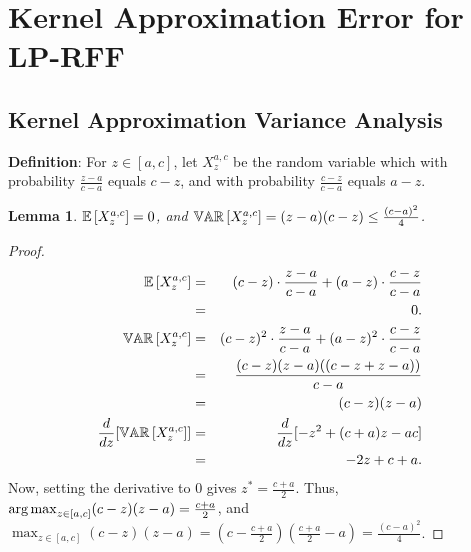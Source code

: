 \documentclass[12pt]{article}
\newtheorem{lemma}[theorem]{Lemma}
\begin{document}
%


\section{Kernel Approximation Error for LP-RFF}
\label{sec:kernel_approx}

\subsection{Kernel Approximation Variance Analysis}
\noindent\textbf{Definition}:  For $z \in [a,c]$, let $X_z^{a,c}$ be the random variable which with probability $\frac{z-a}{c-a}$ equals $c-z$, and with probability $\frac{c-z}{c-a}$ equals $a-z$.

\begin{lemma}
\label{lemma:qvar}
$\expect{}{X_z^{a,c}} = 0$, and $\var{}{X_z^{a,c}} = (z-a)(c-z) \leq \frac{(c-a)^2}{4}$.
\end{lemma}

\begin{proof}
\begin{eqnarray*}
	\expect{}{X_z^{a,c}} &=&  (c-z)\cdot \frac{z-a}{c-a} + (a-z)\cdot \frac{c-z}{c-a}\\
	&=& 0 .\\
	\var{}{X_z^{a,c}} &=& (c-z)^2\cdot \frac{z-a}{c-a} + (a-z)^2\cdot \frac{c-z}{c-a}\\
	&=& \frac{(c-z)(z-a)((c-z + z-a))}{c-a} \\
	&=& (c-z)(z-a)\\
	\frac{d}{dz}[\var{}{X_z^{a,c}}] &=& \frac{d}{dz}[-z^2 + (c+a)z -ac] \\
	&=& -2z + c+a.
\end{eqnarray*}
Now, setting the derivative to 0 gives $z^* = \frac{c+a}{2}$.  Thus, $\operatorname*{arg\,max}_{z\in[a,c]} (c-z)(z-a) = \frac{c+a}{2}$, and $\max_{z\in[a,c]} (c-z)(z-a) = (c-\frac{c+a}{2})(\frac{c+a}{2}-a) = \frac{(c-a)^2}{4}$.
\end{proof}
\end{document}
